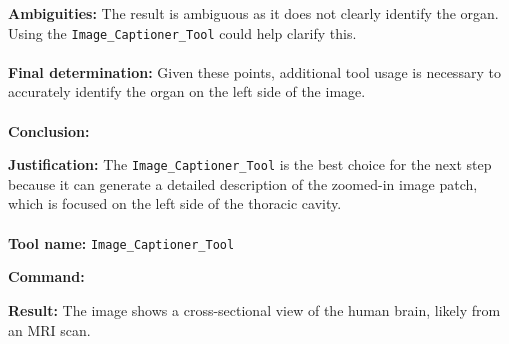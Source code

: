 \begin{plannerbox}
\textbf{Ambiguities:}
The result is ambiguous as it does not clearly identify the organ. Using the \texttt{Image\_Captioner\_Tool} could help clarify this.
\\\\
\textbf{Final determination:}
Given these points, additional tool usage is necessary to accurately identify the organ on the left side of the image.
\\\\
\textbf{Conclusion:} 
\end{plannerbox}


\begin{plannerbox}

\textbf{Justification:}
The \texttt{Image\_Captioner\_Tool} is the best choice for the next step because it can generate a detailed description of the zoomed-in image patch, which is focused on the left side of the thoracic cavity.
\\\\
\textbf{Tool name:} \texttt{Image\_Captioner\_Tool}
\end{plannerbox}


\begin{executorbox}
\textbf{Command:}
\end{executorbox}


\begin{executorbox}
\textbf{Result:} The image shows a cross-sectional view of the human brain, likely from an MRI scan. 
\end{executorbox}


